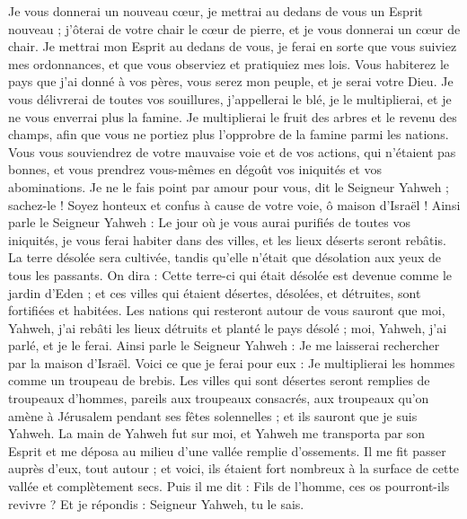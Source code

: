 \begin{multicols}{2}
Je vous donnerai un nouveau cœur, je mettrai au dedans de vous un Esprit nouveau ; j'ôterai de votre chair le cœur de pierre, et je vous donnerai un cœur de chair.
Je mettrai mon Esprit au dedans de vous, je ferai en sorte que vous suiviez mes ordonnances, et que vous observiez et pratiquiez mes lois.
Vous habiterez le pays que j'ai donné à vos pères, vous serez mon peuple, et je serai votre Dieu.
Je vous délivrerai de toutes vos souillures, j'appellerai le blé, je le multiplierai, et je ne vous enverrai plus la famine.
Je multiplierai le fruit des arbres et le revenu des champs, afin que vous ne portiez plus l'opprobre de la famine parmi les nations.
Vous vous souviendrez de votre mauvaise voie et de vos actions, qui n'étaient pas bonnes, et vous prendrez vous-mêmes en dégoût vos iniquités et vos abominations.
Je ne le fais point par amour pour vous, dit le Seigneur Yahweh ; sachez-le ! Soyez honteux et confus à cause de votre voie, ô maison d'Israël !
Ainsi parle le Seigneur Yahweh : Le jour où je vous aurai purifiés de toutes vos iniquités, je vous ferai habiter dans des villes, et les lieux déserts seront rebâtis.
La terre désolée sera cultivée, tandis qu'elle n'était que désolation aux yeux de tous les passants.
On dira : Cette terre-ci qui était désolée est devenue comme le jardin d'Eden ; et ces villes qui étaient désertes, désolées, et détruites, sont fortifiées et habitées.
Les nations qui resteront autour de vous sauront que moi, Yahweh, j'ai rebâti les lieux détruits et planté le pays désolé ; moi, Yahweh, j'ai parlé, et je le ferai.
Ainsi parle le Seigneur Yahweh : Je me laisserai rechercher par la maison d'Israël. Voici ce que je ferai pour eux : Je multiplierai les hommes comme un troupeau de brebis.
Les villes qui sont désertes seront remplies de troupeaux d'hommes, pareils aux troupeaux consacrés, aux troupeaux qu'on amène à Jérusalem pendant ses fêtes solennelles ; et ils sauront que je suis Yahweh.
\VerseOne{}La main de Yahweh fut sur moi, et Yahweh me transporta par son Esprit et me déposa au milieu d'une vallée remplie d'ossements.
Il me fit passer auprès d'eux, tout autour ; et voici, ils étaient fort nombreux à la surface de cette vallée et complètement secs.
Puis il me dit : Fils de l'homme, ces os pourront-ils revivre ? Et je répondis : Seigneur Yahweh, tu le sais.

\end{multicols}
